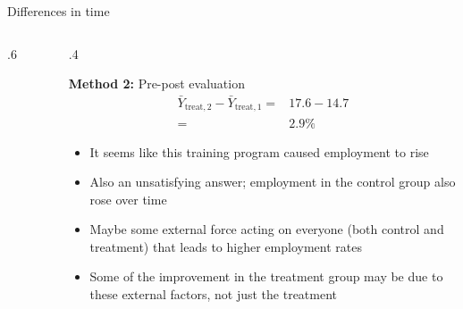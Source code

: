 \begin{frame}[t]{Differences in time}
\begin{columns}
\begin{column}{.6\textwidth}
\begin{figure}
\begin{tikzpicture}
\end{tikzpicture}
\end{figure}

\end{column}

\begin{column}{.4\textwidth}

\textbf{Method 2:} Pre-post evaluation
    \begin{align*}
        \bar{Y}_{\text{treat}, 2} - \bar{Y}_{\text{treat}, 1} =& 17.6 - 14.7 \\
        =& 2.9\%
    \end{align*}
\begin{itemize}
    \item It seems like this training program caused employment to rise
    \item Also an unsatisfying answer; employment in the control group also rose over time
    \item Maybe some external force acting on everyone (both control and treatment) that leads to higher employment rates
    \item Some of the improvement in the treatment group may be due to these external factors, not just the treatment

\end{itemize}

\end{column}
\end{columns}

\end{frame}

